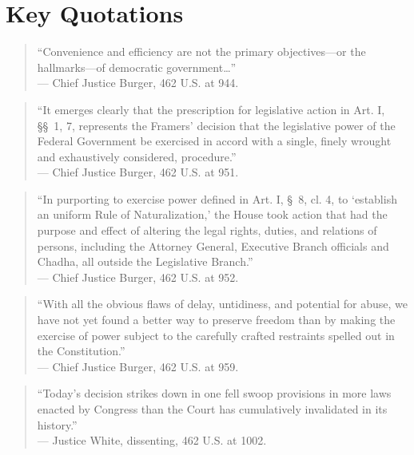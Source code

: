 \documentclass[12pt]{article}
\begin{document}
\section{Key Quotations}
\begin{quote}
``Convenience and efficiency are not the primary objectives---or the hallmarks---of democratic government\ldots'' \\
--- Chief Justice Burger, 462 U.S. at 944.
\end{quote}

\begin{quote}
``It emerges clearly that the prescription for legislative action in Art. I, \S\S~1, 7, represents the Framers' decision that the legislative power of the Federal Government be exercised in accord with a single, finely wrought and exhaustively considered, procedure.'' \\
--- Chief Justice Burger, 462 U.S. at 951.
\end{quote}

\begin{quote}
``In purporting to exercise power defined in Art. I, \S~8, cl. 4, to `establish an uniform Rule of Naturalization,' the House took action that had the purpose and effect of altering the legal rights, duties, and relations of persons, including the Attorney General, Executive Branch officials and Chadha, all outside the Legislative Branch.'' \\
--- Chief Justice Burger, 462 U.S. at 952.
\end{quote}

\begin{quote}
``With all the obvious flaws of delay, untidiness, and potential for abuse, we have not yet found a better way to preserve freedom than by making the exercise of power subject to the carefully crafted restraints spelled out in the Constitution.'' \\
--- Chief Justice Burger, 462 U.S. at 959.
\end{quote}

\begin{quote}
``Today's decision strikes down in one fell swoop provisions in more laws enacted by Congress than the Court has cumulatively invalidated in its history.'' \\
--- Justice White, dissenting, 462 U.S. at 1002.
\end{quote}
\end{document}
